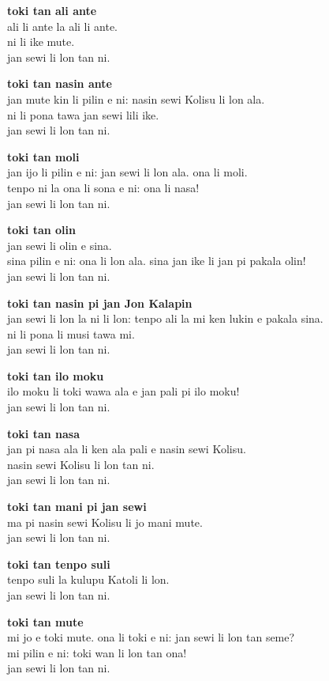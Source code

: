 \textbf{toki tan ali ante}   \\
ali li ante la ali li ante.   \\
ni li ike mute.   \\
jan sewi li lon tan ni.

\textbf{toki tan nasin ante}   \\
jan mute kin li pilin e ni: nasin sewi Kolisu li lon ala.       \\
ni li pona tawa jan sewi lili ike.   \\
jan sewi li lon tan ni.

\textbf{toki tan moli}   \\
jan ijo li pilin e ni: jan sewi li lon ala. ona li moli.   \\
tenpo ni la ona li sona e ni: ona li nasa!   \\
jan sewi li lon tan ni.

\textbf{toki tan olin}   \\
jan sewi li olin e sina.   \\
sina pilin e ni: ona li lon ala. sina jan ike li jan pi pakala olin!   \\
jan sewi li lon tan ni.

\textbf{toki tan nasin pi jan Jon Kalapin}  \\
jan sewi li lon la ni li lon: tenpo ali la mi ken lukin e pakala sina.   \\
ni li pona li musi tawa mi.   \\
jan sewi li lon tan ni.

\textbf{toki tan ilo moku}   \\
ilo moku li toki wawa ala e jan pali pi ilo moku!   \\
jan sewi li lon tan ni.

\textbf{toki tan nasa}   \\
jan pi nasa ala li ken ala pali e nasin sewi Kolisu.   \\
nasin sewi Kolisu li lon tan ni.   \\
jan sewi li lon tan ni.

\textbf{toki tan mani pi jan sewi}   \\
ma pi nasin sewi Kolisu li jo mani mute.   \\
jan sewi li lon tan ni.

\textbf{toki tan tenpo suli}   \\
tenpo suli la kulupu Katoli li lon.   \\
jan sewi li lon tan ni.

\textbf{toki tan mute}   \\
mi jo e toki mute. ona li toki e ni: jan sewi li lon tan seme?   \\
mi pilin e ni: toki wan li lon tan ona!   \\
jan sewi li lon tan ni.

